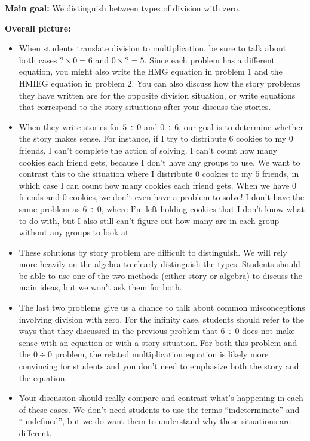 \documentclass[nooutcomes,noauthor, handout]{ximera}
\begin{document}
\newpage

\begin{instructorNotes} 



{\bf Main goal:} We distinguish between types of division with zero.


{\bf Overall picture:} 



\begin{itemize}
	\item When students translate division to multiplication, be sure to talk about both cases $? \times 0 = 6$ and $0 \times ? = 5$. Since each problem has a different equation, you might also write the HMG equation in problem 1 and the HMIEG equation in problem 2. You can also discuss how the story problems they have written are for the opposite division situation, or write equations that correspond to the story situations after your discuss the stories.
	\item When they write stories for $5 \div 0$ and $0 \div 6$, our goal is to determine whether the story makes sense. For instance, if I try to distribute $6$ cookies to my $0$ friends, I can't complete the action of solving. I can't count how many cookies each friend gets, because I don't have any groups to use. We want to contrast this to the situation where I distribute $0$ cookies to my $5$ friends, in which case I can count how many cookies each friend gets. When we have $0$ friends and $0$ cookies, we don't even have a problem to solve! I don't have the same problem as $6 \div 0$, where I'm left holding cookies that I don't know what to do with, but I also still can't figure out how many are in each group without any groups to look at.
	\item These solutions by story problem are difficult to distinguish. We will rely more heavily on the algebra to clearly distinguish the types. Students should be able to use one of the two methods (either story or algebra) to discuss the main ideas, but we won't ask them for both.
	\item The last two problems give us a chance to talk about common misconceptions involving division with zero. For the infinity case, students should refer to the ways that they discussed in the previous problem that $6 \div 0$ does not make sense with an equation or with a story situation. For both this problem and the $0 \div 0$ problem, the related multiplication equation is likely more convincing for students and you don't need to emphasize both the story and the equation.
	\item Your discussion should really compare and contrast what's happening in each of these cases. We don't need students to use the terms ``indeterminate'' and ``undefined'', but we do want them to understand why these situations are different.
\end{itemize}



\end{instructorNotes}
\end{document}
